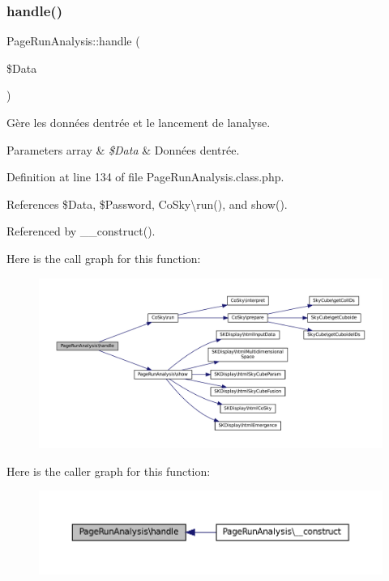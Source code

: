 \subsubsection{\texorpdfstring{handle()}{handle()}\hspace{0.1cm}{\footnotesize\ttfamily [2/2]}}
{\footnotesize\ttfamily Page\+Run\+Analysis\+::handle (\begin{DoxyParamCaption}\item[{}]{\$\+Data }\end{DoxyParamCaption})\hspace{0.3cm}{\ttfamily [protected]}}

Gère les données d\textquotesingle{}entrée et le lancement de l\textquotesingle{}analyse. 
\begin{DoxyParams}[1]{Parameters}
array & {\em \$\+Data} & Données d\textquotesingle{}entrée. \\
\hline
\end{DoxyParams}


Definition at line 134 of file Page\+Run\+Analysis.\+class.\+php.



References \$\+Data, \$\+Password, Co\+Sky\textbackslash{}run(), and show().



Referenced by \+\_\+\+\_\+construct().

Here is the call graph for this function\+:
\nopagebreak
\begin{figure}[H]
\begin{center}
\leavevmode
\includegraphics[width=350pt]{class_page_run_analysis_a568bf81b0bfacd815f07ef353836b64c_cgraph}
\end{center}
\end{figure}
Here is the caller graph for this function\+:\nopagebreak
\begin{figure}[H]
\begin{center}
\leavevmode
\includegraphics[width=350pt]{class_page_run_analysis_a568bf81b0bfacd815f07ef353836b64c_icgraph}
\end{center}
\end{figure}
\mbox{\label{class_page_run_analysis_acd5e0e94b4fc228110dc253569437ae2}} 
